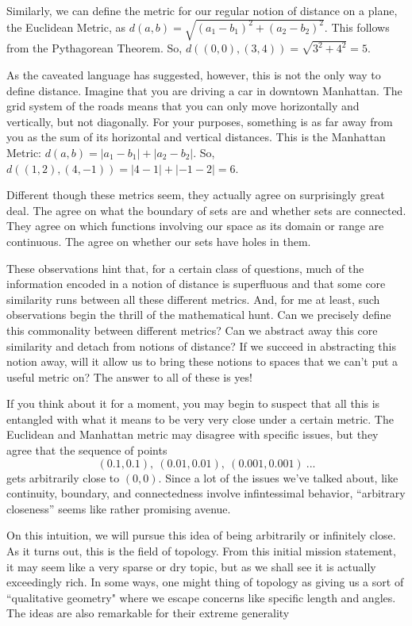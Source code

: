 \documentclass{report}
\begin{document}
Similarly, we can define the metric for our regular notion of distance on a plane, the Euclidean Metric, as $d(a,b) = \sqrt{(a_1-b_1)^2 + (a_2-b_2)^2}$. This follows from the Pythagorean Theorem. So, $d((0,0), (3,4)) = \sqrt{3^2+4^2} = 5$.

As the caveated language has suggested, however, this is not the only way to define distance. Imagine that you are driving a car in downtown Manhattan. The grid system of the roads means that you can only move horizontally and vertically, but not diagonally. For your purposes, something is as far away from you as the sum of its horizontal and vertical distances. This is the Manhattan Metric: $d(a,b) = |a_1-b_1| + |a_2-b_2|$. So, $d((1,2), (4, -1)) = |4-1| + |-1 -2| = 6$.

Different though these metrics seem, they actually agree on surprisingly great deal. The agree on what the boundary of sets are and whether sets are connected. They agree on which functions involving our space as its domain or range are continuous. The agree on whether our sets have holes in them.

These observations hint that, for a certain class of questions, much of the information encoded in a notion of distance is superfluous and that some core similarity runs between all these different metrics. And, for me at least, such observations begin the thrill of the mathematical hunt. Can we precisely define this commonality between different metrics? Can we abstract away this core similarity and detach from notions of distance? If we succeed in abstracting this notion away, will it allow us to bring these notions to spaces that we can't put a useful metric on? The answer to all of these is yes!

If you think about it for a moment, you may begin to suspect that all this is entangled with what it means to be very very close under a certain metric. The Euclidean and Manhattan metric may disagree with specific issues, but they agree that the sequence of points $$(0.1,0.1), ~ (0.01,0.01), ~ (0.001,0.001) ~...$$ gets arbitrarily close to $(0,0)$. Since a lot of the issues we've talked about, like continuity, boundary, and connectedness involve infintessimal behavior, ``arbitrary closeness'' seems like rather promising avenue.

On this intuition, we will pursue this idea of being arbitrarily or infinitely close. As it turns out, this is the field of topology. From this initial mission statement, it may seem like a very sparse or dry topic, but as we shall see it is actually exceedingly rich. In some ways, one might thing of topology as giving us a sort of ``qualitative geometry" where we escape concerns like specific length and angles. The ideas are also remarkable for their extreme generality
\end{document}
